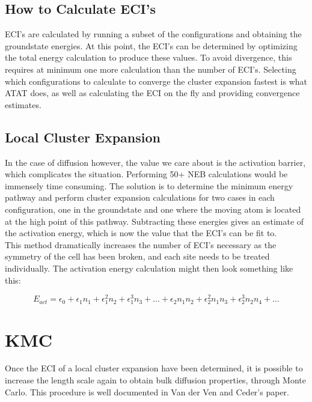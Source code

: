 \documentclass[12pt]{article}
\begin{document}
\subsection{How to Calculate ECI's}
ECI's are calculated by running a subset of the configurations and obtaining the groundstate energies.  At this point, the ECI's can be determined by optimizing the total energy calculation to produce these values.  To avoid divergence, this requires at minimum one more calculation than the number of ECI's. Selecting which configurations to calculate to converge the cluster expansion fastest is what ATAT does, as well as calculating the ECI on the fly and providing convergence estimates.  \\

\subsection{Local Cluster Expansion}
In the case of diffusion however, the value we care about is the activation barrier, which complicates the situation.  Performing 50+ NEB calculations would be immensely time consuming.  The solution is to determine the minimum energy pathway and perform cluster expansion calculations for two cases in each configuration, one in the groundstate and one where the moving atom is located at the high point of this pathway.  Subtracting these energies gives an estimate of the activation energy, which is now the value that the ECI's can be fit to.  \\

This method dramatically increases the number of ECI's necessary as the symmetry of the cell has been broken, and each site needs to be treated individually.  The activation energy calculation might then look something like this:

\[
E_{act} = \epsilon_0 + \epsilon_1 n_1 + \epsilon_1^2 n_2 + \epsilon_1^3 n_3 + \dots + \epsilon_2 n_1n_2 +\epsilon_2^2 n_1n_3 + \epsilon_2^3 n_2n_4 + \dots
\]



\section{KMC}
Once the ECI of a local cluster expansion have been determined, it is possible to increase the length scale again to obtain bulk diffusion properties, through Monte Carlo.  This procedure is well documented in Van der Ven and Ceder's paper.  
\end{document}
